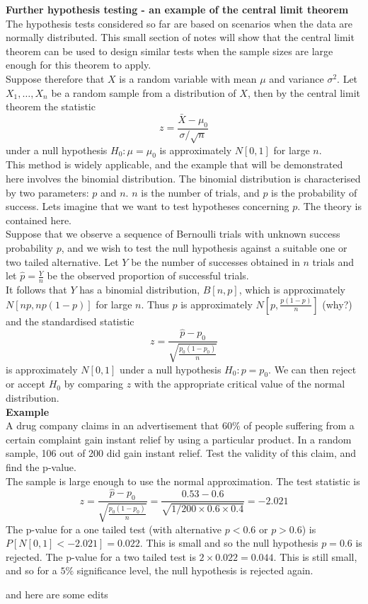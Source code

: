 \documentclass[12pt]{article}
\begin{document}
\nonumber
\textbf{Further hypothesis testing - an example of the central limit theorem}\\

The hypothesis tests considered so far are based on scenarios when the data are normally distributed. This small section of notes will show that the central limit theorem can be used to design similar tests when the sample sizes are large enough for this theorem to apply.\\

Suppose therefore that $X$ is a random variable with mean $\mu$ and variance $\sigma^{2}$. Let $X_{1},\ldots,X_{n}$ be a random sample from a distribution of $X$, then by the central limit theorem the statistic $$z=\frac{\bar{X}-\mu_{0}}{\sigma/\sqrt{n}}$$ under a null hypothesis $H_{0}:\mu=\mu_{0}$ is approximately $N[0,1]$ for large $n$.\\

This method is widely applicable, and the example that will be demonstrated here involves the binomial distribution. The binomial distribution is characterised by two parameters: $p$ and $n$. $n$ is the number of trials, and $p$ is the probability of success. Lets imagine that we want to test hypotheses concerning $p$. The theory is contained here.\\

Suppose that we observe a sequence of Bernoulli trials with unknown success probability $p$, and we wish to test the null hypothesis against a suitable one or two tailed alternative. Let $Y$ be the number of successes obtained in $n$ trials and let $\hat{p}=\frac{Y}{n}$ be the observed proportion of successful trials.\\

It follows that $Y$ has a binomial distribution, $B[n,p]$, which is approximately $N[np,np(1-p)]$ for large $n$. Thus $\hat{p}$ is approximately $N[p,\frac{p(1-p)}{n}]$ (why?) and the standardised statistic $$z=\frac{\hat{p}-p_0}{\sqrt{\frac{p_0(1-p_0)}{n}}}$$ is approximately $N[0,1]$ under a null hypothesis $H_{0}:p=p_0$. We can then reject or accept $H_{0}$ by comparing $z$ with the appropriate critical value of the normal distribution.\\

\textbf{Example}\\
A drug company claims in an advertisement that $60\%$ of people suffering from a certain complaint gain instant relief by using a particular product. In a random sample, 106 out of 200 did gain instant relief. Test the validity of this claim, and find the p-value.\\

The sample is large enough to use the normal approximation. The test statistic is $$z=\frac{\hat{p}-p_0}{\sqrt{\frac{p_0(1-p_0)}{n}}}=\frac{0.53-0.6}{\sqrt{1/200 \times 0.6 \times 0.4}}=-2.021$$
The p-value for a one tailed test (with alternative $p<0.6$ or $p>0.6$) is $P[N[0,1]<-2.021]=0.022$. This is small and so the null hypothesis $p=0.6$ is rejected. The p-value for a two tailed test is $2 \times 0.022=0.044$. This is still small, and so for a $5\%$ significance level, the null hypothesis is rejected again.

and here are some edits
\end{document}

